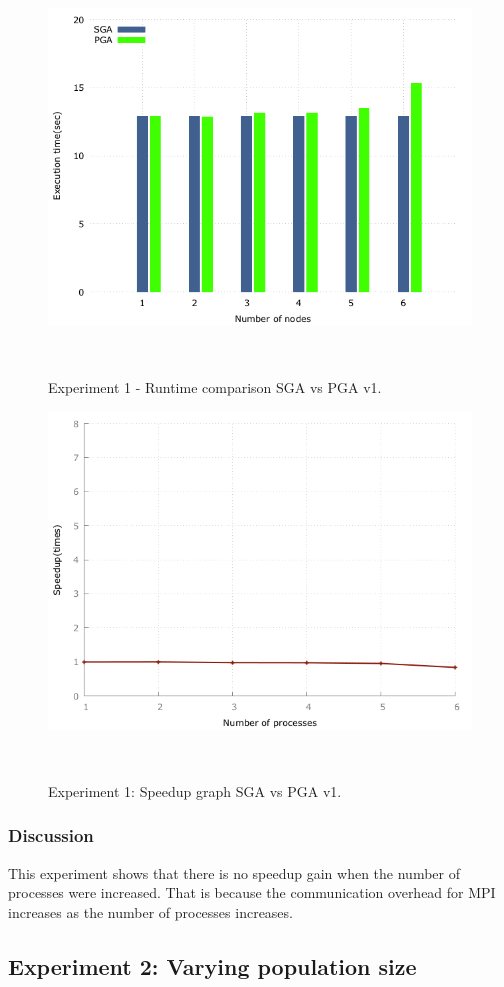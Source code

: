 \begin{figure}[H]
\begin{center}
  \includegraphics[width=.7 \linewidth]{stats_data_new/graphs/pga_xNodes_hist.png}
  \caption{Experiment 1 - Runtime comparison SGA vs PGA v1.}
  \end{center}\
\end{figure}

\begin{figure}[H]
\begin{center}
  \includegraphics[width=.7 \linewidth]{stats_data_new/graphs/pga_xNodes_line.png}
  \caption{Experiment 1: Speedup graph SGA vs PGA v1.}
  \end{center}\
\end{figure}

\subsubsection{Discussion}
This experiment shows that there is no speedup gain when the number of processes were increased. That is because the communication overhead for MPI increases as the number of processes increases.

\subsection{Experiment 2: Varying population size}

